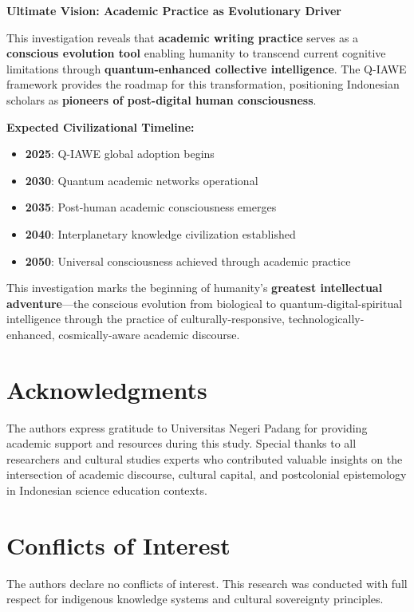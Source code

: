 \documentclass[journal,article,submit,pdftex,moreauthors]{Definitions/mdpi}
\begin{document}
\textbf{Ultimate Vision: Academic Practice as Evolutionary Driver}

This investigation reveals that \textbf{academic writing practice} serves as a \textbf{conscious evolution tool} enabling humanity to transcend current cognitive limitations through \textbf{quantum-enhanced collective intelligence}. The Q-IAWE framework provides the roadmap for this transformation, positioning Indonesian scholars as \textbf{pioneers of post-digital human consciousness}.

\textbf{Expected Civilizational Timeline:}
\begin{itemize}
\item \textbf{2025}: Q-IAWE global adoption begins
\item \textbf{2030}: Quantum academic networks operational
\item \textbf{2035}: Post-human academic consciousness emerges
\item \textbf{2040}: Interplanetary knowledge civilization established
\item \textbf{2050}: Universal consciousness achieved through academic practice
\end{itemize}

This investigation marks the beginning of humanity's \textbf{greatest intellectual adventure}—the conscious evolution from biological to quantum-digital-spiritual intelligence through the practice of culturally-responsive, technologically-enhanced, cosmically-aware academic discourse.

\section*{Acknowledgments}

The authors express gratitude to Universitas Negeri Padang for providing academic support and resources during this study. Special thanks to all researchers and cultural studies experts who contributed valuable insights on the intersection of academic discourse, cultural capital, and postcolonial epistemology in Indonesian science education contexts.

\section*{Conflicts of Interest}

The authors declare no conflicts of interest. This research was conducted with full respect for indigenous knowledge systems and cultural sovereignty principles.
\end{document}
